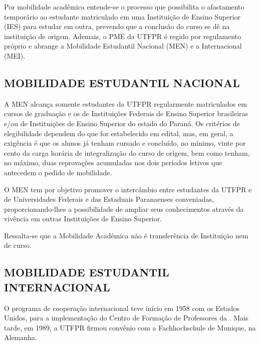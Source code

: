 
Por mobilidade acadêmica entende-se o processo que possibilita o afastamento temporário ao estudante matriculado em uma Instituição de Ensino Superior (IES) para estudar em outra, prevendo que a conclusão do curso se dê na instituição de origem. Ademais, o PME da UTFPR é regido por regulamento próprio e abrange a Mobilidade Estudantil Nacional (MEN) e a Internacional (MEI).


\subsection{MOBILIDADE ESTUDANTIL NACIONAL}

A MEN alcança somente estudantes da UTFPR regularmente matriculados em cursos de graduação e os de Instituições Federais de Ensino Superior brasileiras e/ou de Instituições de Ensino Superior do estado do Paraná. Os critérios de elegibilidade dependem do que for estabelecido em edital, mas, em geral, a exigência é que os alunos já tenham cursado e concluído, no mínimo, vinte por cento da carga horária de integralização do curso de origem, bem como tenham, no máximo, duas reprovações acumuladas nos dois períodos letivos que antecedem o pedido de mobilidade.
 
O MEN tem por objetivo promover o intercâmbio entre estudantes da UTFPR e de Universidades Federais e das Estaduais Paranaenses conveniadas, proporcionando-lhes a possibilidade de ampliar seus conhecimentos através da vivência em outras Instituições de Ensino Superior.

Ressalta-se que a Mobilidade Acadêmica não é transferência de Instituição nem de curso.

\subsection{MOBILIDADE ESTUDANTIL INTERNACIONAL}

O programa de cooperação internacional teve início em 1958 com os Estados Unidos, para a implementação do Centro de Formação de Professores da . Mais tarde, em 1989, a UTFPR firmou convênio com a Fachhochschule de Munique, na Alemanha.

